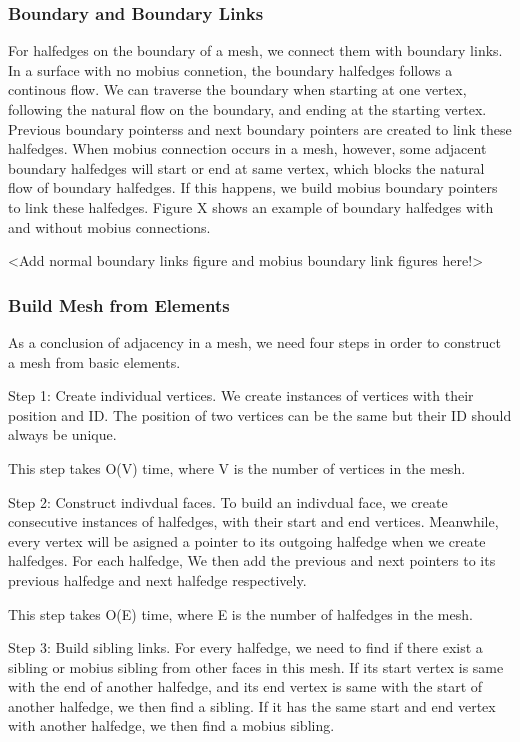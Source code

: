 \documentclass[12pt]{article}
\begin{document}
\subsubsection{Boundary and Boundary Links}

For halfedges on the boundary of a mesh, we connect them with boundary links. In a surface with no mobius connetion, the boundary halfedges follows a continous flow. We can traverse the boundary when starting at one vertex, following the natural flow on the boundary, and ending at the starting vertex. Previous boundary pointerss and next boundary pointers are created to link these halfedges. When mobius connection occurs in a mesh, however, some adjacent boundary halfedges will start or end at same vertex, which blocks the natural flow of boundary halfedges. If this happens, we build mobius boundary pointers to link these halfedges. Figure X shows an example of boundary halfedges with and without mobius connections.

<Add normal boundary links figure and mobius boundary link figures here!>

\subsubsection{Build Mesh from Elements}

As a conclusion of adjacency in a mesh, we need four steps in order to construct a mesh from basic elements.

Step 1: Create individual vertices. We create instances of vertices with their position and ID. The position of two vertices can be the same but their ID should always be unique. 

This step takes O(V) time, where V is the number of vertices in the mesh.

Step 2: Construct indivdual faces. To build an indivdual face, we create consecutive instances of halfedges, with their start and end vertices. Meanwhile, every vertex will be asigned a pointer to its outgoing halfedge when we create halfedges. For each halfedge, We then add the previous and next pointers to its previous halfedge and next halfedge respectively. 

This step takes O(E) time, where E is the number of halfedges in the mesh.

Step 3: Build sibling links. For every halfedge, we need to find if there exist a sibling or mobius sibling from other faces in this mesh. If its start vertex is same with the end of another halfedge, and its end vertex is same with the start of another halfedge, we then find a sibling. If it has the same start and end vertex with another halfedge, we then find a mobius sibling. 
\end{document}
